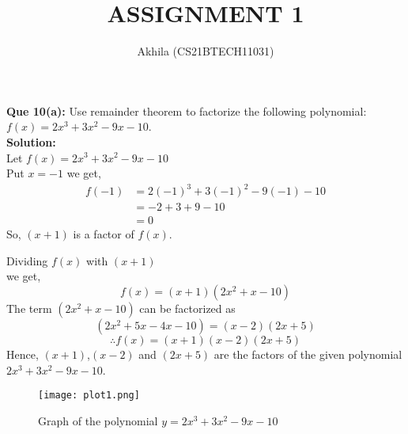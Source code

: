 \documentclass[12pt,twocolumn]{article}
\begin{document}
\large \title{ASSIGNMENT 1}
\author{Akhila (CS21BTECH11031)}
\maketitle
{\Large \textbf  {Que 10(a): }}
Use remainder theorem to factorize the following polynomial:\\
$f(x)=2x^3+3x^2-9x-10$.\\


{\Large \textbf  {Solution:}}\\
Let $f(x)=2x^3+3x^2-9x-10$ \\
Put $x=-1$ we get,
\begin{align*}
f(-1) & =2(-1)^3+3(-1)^2-9(-1)-10\\
      & =-2+3+9-10\\ 
      & =0
\end{align*}
So, $(x+1)$ is a factor of $f(x)$.

Dividing $f(x)$ with $(x+1)$\\ 
 we get,
\begin{equation*}
    f(x)=(x+1)(2x^2+x-10)
\end{equation*}
The term $(2x^2+x-10)$ can be factorized as
\begin{equation*}
    (2x^2+5x-4x-10)=(x-2)(2x+5)
\end{equation*}
\begin{equation*}
    \therefore f(x)=(x+1)(x-2)(2x+5)
\end{equation*}
Hence,  $(x+1)$,$(x-2)$ and $(2x+5)$  are the factors of the given polynomial\\
$2x^3+3x^2-9x-10$.
\begin{figure}[H]
    \centering
    \texttt{[image: plot1.png]}
    \captionsetup{justification=centering,margin=1cm}
    \caption{Graph of the polynomial $y=2x^3+3x^2-9x-10$}
    \label{fig:1}
\end{figure}
\end{document}
